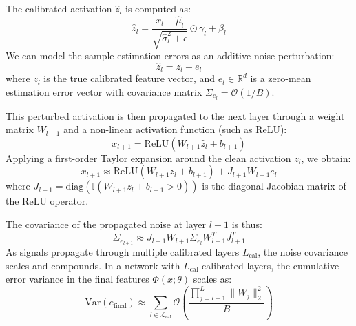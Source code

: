 \documentclass{article}
\theoremstyle{plain}
\theoremstyle{definition}
\begin{document}
The calibrated activation $\hat{z}_l$ is computed as:
\begin{equation}
    \hat{z}_l = \frac{x_l - \hat{\mu}_l}{\sqrt{\hat{\sigma}^2_l + \epsilon}} \odot \gamma_l + \beta_l
\end{equation}
We can model the sample estimation errors as an additive noise perturbation:
\begin{equation}
    \hat{z}_l = z_l + e_l
\end{equation}
where $z_l$ is the true calibrated feature vector, and $e_l \in \mathbb{R}^d$ is a zero-mean estimation error vector with covariance matrix $\Sigma_{e_l} = \mathcal{O}(1/B)$.

This perturbed activation is then propagated to the next layer through a weight matrix $W_{l+1}$ and a non-linear activation function (such as ReLU):
\begin{equation}
    x_{l+1} = \text{ReLU}\left( W_{l+1} \hat{z}_l + b_{l+1} \right)
\end{equation}
Applying a first-order Taylor expansion around the clean activation $z_l$, we obtain:
\begin{equation}
    x_{l+1} \approx \text{ReLU}\left( W_{l+1} z_l + b_{l+1} \right) + J_{l+1} W_{l+1} e_l
\end{equation}
where $J_{l+1} = \text{diag}\left( \mathbb{I}(W_{l+1} z_l + b_{l+1} > 0) \right)$ is the diagonal Jacobian matrix of the ReLU operator.

The covariance of the propagated noise at layer $l+1$ is thus:
\begin{equation}
    \Sigma_{e_{l+1}} \approx J_{l+1} W_{l+1} \Sigma_{e_l} W_{l+1}^T J_{l+1}^T
\end{equation}
As signals propagate through multiple calibrated layers $L_{\text{cal}}$, the noise covariance scales and compounds. In a network with $L_{\text{cal}}$ calibrated layers, the cumulative error variance in the final features $\Phi(x; \theta)$ scales as:
\begin{equation}
    \label{eq:cumulative_noise}
    \text{Var}\left( e_{\text{final}} \right) \approx \sum_{l \in \mathcal{L}_{\text{cal}}} \mathcal{O}\left( \frac{\prod_{j=l+1}^L \|W_j\|^2_2}{B} \right)
\end{equation}
\end{document}
